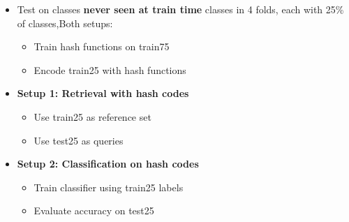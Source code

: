 \documentclass{article}
\begin{document}
\begin{itemize}
\item Test on classes \textbf{never seen at train time}
\itemSplit classes in 4 folds, each with 25\% of classes,Both setups:
    \begin{itemize}
    \item Train hash functions on train75
    \item Encode train25 with hash functions
    \end{itemize}
\item \textbf{Setup 1: Retrieval with hash codes}
    \begin{itemize}
    \item Use train25 as reference set
    \item Use test25 as queries
    \end{itemize}
\item \textbf{Setup 2: Classification on hash codes}
    \begin{itemize}
    \item Train classifier using train25 labels
    \item Evaluate accuracy on test25
    \end{itemize}
\end{itemize}
\end{document}
